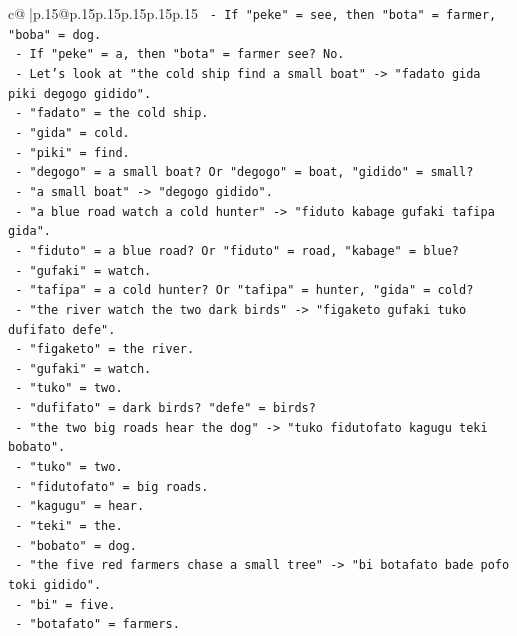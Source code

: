 \documentclass{article}
\begin{document}
{\begin{supertabular}{c@{$\;$}|p{.15\linewidth}@{}p{.15\linewidth}p{.15\linewidth}p{.15\linewidth}p{.15\linewidth}p{.15\linewidth}}
{{{\texttt{        {-} If "peke" = see, then "bota" = farmer, "boba" = dog.} \\
\texttt{        {-} If "peke" = a, then "bota" = farmer see? No.} \\
\texttt{    {-} Let's look at "the cold ship find a small boat" {-}> "fadato gida piki degogo gidido".} \\
\texttt{        {-} "fadato" = the cold ship.} \\
\texttt{        {-} "gida" = cold.} \\
\texttt{        {-} "piki" = find.} \\
\texttt{        {-} "degogo" = a small boat? Or "degogo" = boat, "gidido" = small?} \\
\texttt{        {-} "a small boat" {-}> "degogo gidido".} \\
\texttt{    {-} "a blue road watch a cold hunter" {-}> "fiduto kabage gufaki tafipa gida".} \\
\texttt{        {-} "fiduto" = a blue road? Or "fiduto" = road, "kabage" = blue?} \\
\texttt{        {-} "gufaki" = watch.} \\
\texttt{        {-} "tafipa" = a cold hunter? Or "tafipa" = hunter, "gida" = cold?} \\
\texttt{    {-} "the river watch the two dark birds" {-}> "figaketo gufaki tuko dufifato defe".} \\
\texttt{        {-} "figaketo" = the river.} \\
\texttt{        {-} "gufaki" = watch.} \\
\texttt{        {-} "tuko" = two.} \\
\texttt{        {-} "dufifato" = dark birds? "defe" = birds?} \\
\texttt{    {-} "the two big roads hear the dog" {-}> "tuko fidutofato kagugu teki bobato".} \\
\texttt{        {-} "tuko" = two.} \\
\texttt{        {-} "fidutofato" = big roads.} \\
\texttt{        {-} "kagugu" = hear.} \\
\texttt{        {-} "teki" = the.} \\
\texttt{        {-} "bobato" = dog.} \\
\texttt{    {-} "the five red farmers chase a small tree" {-}> "bi botafato bade pofo toki gidido".} \\
\texttt{        {-} "bi" = five.} \\
\texttt{        {-} "botafato" = farmers.} \\
}}}
\end{supertabular}}
\end{document}
